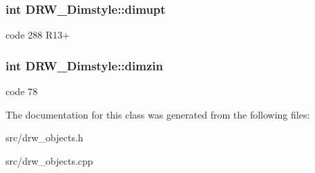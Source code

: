 \subsubsection[{dimupt}]{\setlength{\rightskip}{0pt plus 5cm}int D\+R\+W\+\_\+\+Dimstyle\+::dimupt}\label{class_d_r_w___dimstyle_ada5b945b12f79ebe3246b9b4830eab68}
code 288 R13+ \hypertarget{class_d_r_w___dimstyle_a4922b8e483f9e2ae67ea92aa4f7503c8}{}
\subsubsection[{dimzin}]{\setlength{\rightskip}{0pt plus 5cm}int D\+R\+W\+\_\+\+Dimstyle\+::dimzin}\label{class_d_r_w___dimstyle_a4922b8e483f9e2ae67ea92aa4f7503c8}
code 78 

The documentation for this class was generated from the following files\+:\begin{DoxyCompactItemize}
\item 
src/drw\+\_\+objects.\+h\item 
src/drw\+\_\+objects.\+cpp\end{DoxyCompactItemize}
